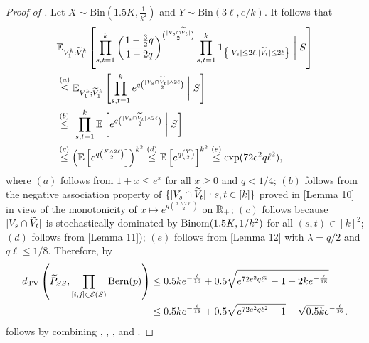 \begin{proof}[Proof of ]
Let $X \sim \text{Bin}(1.5K, \frac{1}{k^2})$ and $Y \sim \text{Bin}( 3 \ell, e/k)$. It follows that
\begin{align}
& \mathbb{E}_{  V_1^k; {\widetilde{V}}_1^k} \left[ \prod_{s,t=1}^k \left( \frac{1-\frac{3}{2} q }{1-2q} \right)^{ \binom{|V_s \cap {\widetilde{V}}_t | }{2} } \prod_{s,t=1}^k {\mathbf{1}_{\left\{{|V_s| \leq 2\ell, |{\widetilde{V}}_t| \leq 2\ell}\right\}}} \biggm \vert S \right] \nonumber \\
& \overset{(a)}{\leq}   \mathbb{E}_{  V_1^k; {\widetilde{V}}_1^k} \left[ \prod_{s,t=1}^k e^{ q \binom{|V_s \cap {\widetilde{V}}_t | \wedge 2\ell}{2} } \biggm \vert S \right] \nonumber \\
& \stackrel{(b) }{\leq}  ~ \prod_{s,t=1}^k \mathbb{E}\left[  e^{ q \binom{|V_s \cap {\widetilde{V}}_t | \wedge 2\ell }{2} }  \biggm \vert S  \right]	\nonumber \\
 & \overset{(c)}{ \le} \left( \mathbb{E} \left[ e^{q\binom{X \wedge 2\ell}{2}} \right ]  \right)^{k^2} \overset{(d)} {\le}    \mathbb{E} \left[ e^{q\binom{Y}{2}} \right]^{k^2} \overset{(e)}{\le}  \exp(72 e^2 q\ell^2), \label{eq:boundchisquare}
\end{align}
where $(a)$ follows from $1+x \le e^x$ for all $x\ge 0$ and $q<1/4$;
$(b)$ follows from the negative association property of $\{|V_s \cap {\widetilde{V}}_t |: s,t\in[k]\}$ proved in
\cite{HajekWuXu14}[Lemma 10] in view of the monotonicity of $x \mapsto e^{q\binom{x \wedge 2\ell}{2}}$ on ${\mathbb{R}}_+$; $(c)$ follows because $|V_s \cap {\widetilde{V}}_t |$ is stochastically dominated by ${\rm Binom}(1.5K, 1/k^2)$ for all $(s, t) \in [k]^2$; $(d)$ follows from 
\cite{HajekWuXu14}[Lemma 11]);
$(e)$ follows from \cite{HajekWuXu14}[Lemma 12] with $\lambda=q/2$ and $q \ell \le 1/8$. Therefore, by 
\begin{align}
d_{\rm TV}  \left(  {\widetilde{P}}_{SS},\prod_{[i,j] \in {\mathcal{E}}(S) } {\rm Bern}(p)  \right) & \le0.5 k e^{-\frac{\ell}{18}} + 0.5 \sqrt{ e^{72e^2 q \ell^2} -1 + 2  k e^{-\frac{\ell}{18}}} \nonumber\\
& \le 0.5 k e^{-\frac{\ell}{18}} + 0.5 \sqrt{e^{72e^2 q \ell^2} -1} + \sqrt{0.5k} e^{-\frac{\ell}{36}}. \label{eq:TotalVariationDiagonal}
\end{align}
 follows by combining , , ,  and .
\end{proof}



